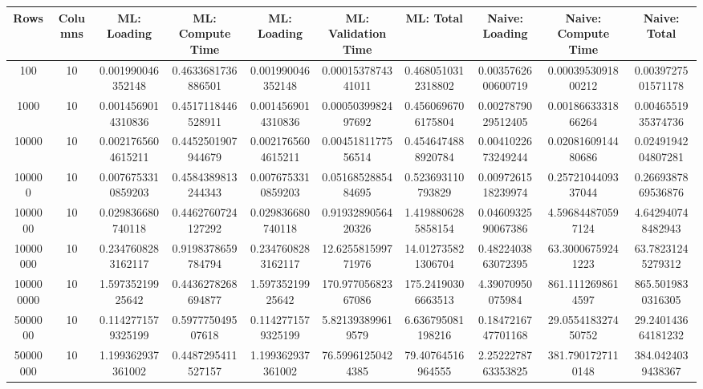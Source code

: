 \begin{table}[htb]
    \centering
    \begin{tabular}{@{}cccccccccc@{}}
        \toprule
        Rows & Columns & ML: Loading & ML: Compute Time & ML: Loading & ML: Validation Time & ML: Total & Naive: Loading & Naive: Compute Time & Naive: Total \\
        \midrule
        100 & 10 & 0.001990046352148 & 0.4633681736886501 & 0.001990046352148 & 0.0001537874341011 & 0.4680510312318802 & 0.0035762600600719 & 0.0003953091800212 & 0.0039727501571178 \\
        1000 & 10 & 0.0014569014310836 & 0.4517118446528911 & 0.0014569014310836 & 0.0005039982497692 & 0.4560696706175804 & 0.0027879029512405 & 0.0018663331866264 & 0.0046551935374736 \\
        10000 & 10 & 0.0021765604615211 & 0.4452501907944679 & 0.0021765604615211 & 0.0045181177556514 & 0.4546474888920784 & 0.0041022673249244 & 0.0208160914480686 & 0.0249194204807281 \\
        100000 & 10 & 0.0076753310859203 & 0.4584389813244343 & 0.0076753310859203 & 0.0516852885484695 & 0.523693110793829 & 0.0097261518239974 & 0.2572104409337044 & 0.2669387869536876 \\
        1000000 & 10 & 0.029836680740118 & 0.4462760724127292 & 0.029836680740118 & 0.9193289056420326 & 1.4198806285858154 & 0.0460932590067386 & 4.596844870597124 & 4.642940748482943 \\
        10000000 & 10 & 0.2347608283162117 & 0.9198378659784794 & 0.2347608283162117 & 12.625581599771976 & 14.012735821306704 & 0.4822403863072395 & 63.30006759241223 & 63.78231245279312 \\
        100000000 & 10 & 1.59735219925642 & 0.4436278268694877 & 1.59735219925642 & 170.97705682367086 & 175.24190306663513 & 4.39070950075984 & 861.1112698614597 & 865.5019830316305 \\
        5000000 & 10 & 0.1142771579325199 & 0.597775049507618 & 0.1142771579325199 & 5.821393899619579 & 6.636795081198216 & 0.1847216747701168 & 29.055418327450752 & 29.240143664181232 \\
        50000000 & 10 & 1.199362937361002 & 0.4487295411527157 & 1.199362937361002 & 76.59961250424385 & 79.40764516964555 & 2.2522278763353825 & 381.7901727110148 & 384.0424039438367 \\
        \bottomrule
    \end{tabular}
\end{table}